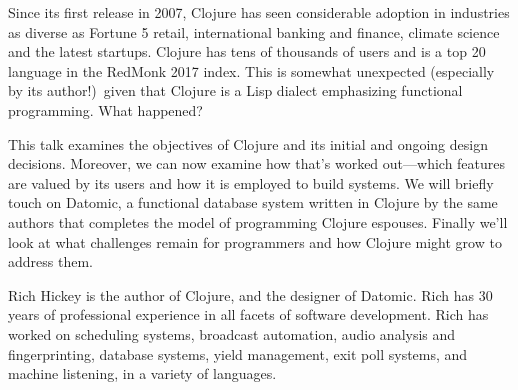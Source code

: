 \medskip


\talkabstract
Since its first release in 2007, Clojure has seen considerable adoption in industries as
diverse as Fortune 5 retail, international banking and finance, climate science and the
latest startups. Clojure has tens of thousands of users and is a top 20 language in the
RedMonk 2017 index. This is somewhat unexpected (especially by its author!)\ given that
Clojure is a Lisp dialect emphasizing functional programming. What happened?

This talk examines the objectives of Clojure and its initial and ongoing design decisions.
Moreover, we can now examine how that's worked out---which features are valued by its users
and how it is employed to build systems. We will briefly touch on Datomic, a functional
database system written in Clojure by the same authors that completes the model of
programming Clojure espouses. Finally we'll look at what challenges remain for programmers
and how Clojure might grow to address them.

\bio
Rich Hickey is the author of Clojure, and the designer of Datomic. Rich has 30 years of
professional experience in all facets of software development. Rich has worked on
scheduling systems, broadcast automation, audio analysis and fingerprinting, database
systems, yield management, exit poll systems, and machine listening, in a variety of
languages.

\newpage
